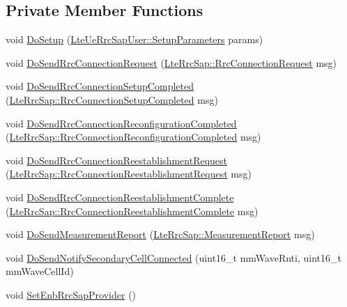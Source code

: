 \subsection*{Private Member Functions}
\begin{DoxyCompactItemize}
\item 
void \hyperlink{classns3_1_1MmWaveUeRrcProtocolIdeal_a31883f117bd197882d706c16ba95b020}{Do\+Setup} (\hyperlink{structns3_1_1LteUeRrcSapUser_1_1SetupParameters}{Lte\+Ue\+Rrc\+Sap\+User\+::\+Setup\+Parameters} params)
\item 
void \hyperlink{classns3_1_1MmWaveUeRrcProtocolIdeal_a7f1b53061ddb2454a8172475e45f8202}{Do\+Send\+Rrc\+Connection\+Request} (\hyperlink{structns3_1_1LteRrcSap_1_1RrcConnectionRequest}{Lte\+Rrc\+Sap\+::\+Rrc\+Connection\+Request} msg)
\item 
void \hyperlink{classns3_1_1MmWaveUeRrcProtocolIdeal_a2ea2b6e2169c936a0c46af871f3540c2}{Do\+Send\+Rrc\+Connection\+Setup\+Completed} (\hyperlink{structns3_1_1LteRrcSap_1_1RrcConnectionSetupCompleted}{Lte\+Rrc\+Sap\+::\+Rrc\+Connection\+Setup\+Completed} msg)
\item 
void \hyperlink{classns3_1_1MmWaveUeRrcProtocolIdeal_a9ff38cf3a78824451cf43223fa994f37}{Do\+Send\+Rrc\+Connection\+Reconfiguration\+Completed} (\hyperlink{structns3_1_1LteRrcSap_1_1RrcConnectionReconfigurationCompleted}{Lte\+Rrc\+Sap\+::\+Rrc\+Connection\+Reconfiguration\+Completed} msg)
\item 
void \hyperlink{classns3_1_1MmWaveUeRrcProtocolIdeal_a259836743c662a2e4a5ef178cebb3091}{Do\+Send\+Rrc\+Connection\+Reestablishment\+Request} (\hyperlink{structns3_1_1LteRrcSap_1_1RrcConnectionReestablishmentRequest}{Lte\+Rrc\+Sap\+::\+Rrc\+Connection\+Reestablishment\+Request} msg)
\item 
void \hyperlink{classns3_1_1MmWaveUeRrcProtocolIdeal_a596f507fec0d8bfcff7456224957628b}{Do\+Send\+Rrc\+Connection\+Reestablishment\+Complete} (\hyperlink{structns3_1_1LteRrcSap_1_1RrcConnectionReestablishmentComplete}{Lte\+Rrc\+Sap\+::\+Rrc\+Connection\+Reestablishment\+Complete} msg)
\item 
void \hyperlink{classns3_1_1MmWaveUeRrcProtocolIdeal_aba41d283744ed2355dd4c6e2fbad6678}{Do\+Send\+Measurement\+Report} (\hyperlink{structns3_1_1LteRrcSap_1_1MeasurementReport}{Lte\+Rrc\+Sap\+::\+Measurement\+Report} msg)
\item 
void \hyperlink{classns3_1_1MmWaveUeRrcProtocolIdeal_abd63c68aba041210470f174e1e456624}{Do\+Send\+Notify\+Secondary\+Cell\+Connected} (uint16\+\_\+t mm\+Wave\+Rnti, uint16\+\_\+t mm\+Wave\+Cell\+Id)
\item 
void \hyperlink{classns3_1_1MmWaveUeRrcProtocolIdeal_adff64b34a950c009747c19c5510700bf}{Set\+Enb\+Rrc\+Sap\+Provider} ()
\end{DoxyCompactItemize}
